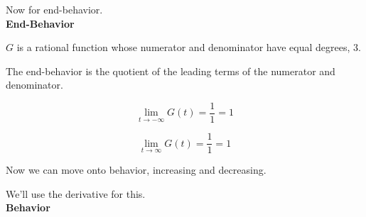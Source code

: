 \documentclass{ximera}
\begin{document}
Now for end-behavior. \\








\textbf{End-Behavior}

\begin{explanation}

$G$ is a rational function whose numerator and denominator have equal degrees, $3$.

The end-behavior is the quotient of the leading terms of the numerator and denominator.

\[
\lim\limits_{t \to -\infty} G(t) = \frac{1}{1} = 1
\]


\[
\lim\limits_{t \to \infty} G(t) = \frac{1}{1} = 1
\]

\end{explanation}




Now we can move onto behavior, increasing and decreasing.

We'll use the derivative for this. \\

























\textbf{Behavior}
\end{document}
